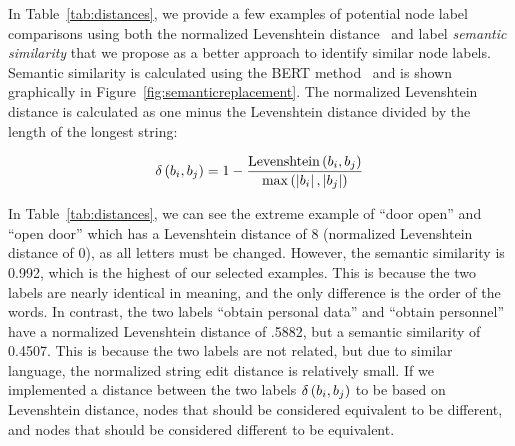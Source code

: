 In Table~\ref{tab:distances}, we provide a few examples of potential node label comparisons using both the normalized Levenshtein distance~\cite{yujian2007normalized} and label \emph{semantic similarity} that we propose as a better approach to identify similar node labels. Semantic similarity is calculated using the BERT method~\cite{devlin2018bert} and is shown graphically in Figure~\ref{fig:semanticreplacement}. The normalized Levenshtein distance is calculated as one minus the Levenshtein distance divided by the length of the longest string:

\[
\delta\left(\ATlabel{d}{i}, \ATlabel{e}{j}\right) = 1 - \frac{\text{Levenshtein}\left(\ATlabel{d}{i}, \ATlabel{e}{j}\right)}{\max\left(\left|\ATlabel{d}{i}\right|, \left|\ATlabel{e}{j}\right|\right)}
\]



In Table~\ref{tab:distances}, we can see the extreme example of ``door open'' and ``open door'' which has a Levenshtein distance of 8 (normalized Levenshtein distance of 0), as all letters must be changed. However, the semantic similarity is 0.992, which is the highest of our selected examples. This is because the two labels are nearly identical in meaning, and the only difference is the order of the words. In contrast, the two labels ``obtain personal data'' and ``obtain personnel'' have a normalized Levenshtein distance of .5882, but a semantic similarity of 0.4507. This is because the two labels are not related, but due to similar language, the normalized string edit distance is relatively small. If we implemented a distance between the two labels
$\delta\left(\ATlabel{d}{i}, \ATlabel{e}{j}\right)$ %
to be based on Levenshtein distance, nodes that should be considered equivalent to be different, and nodes that should be considered different to be equivalent.

